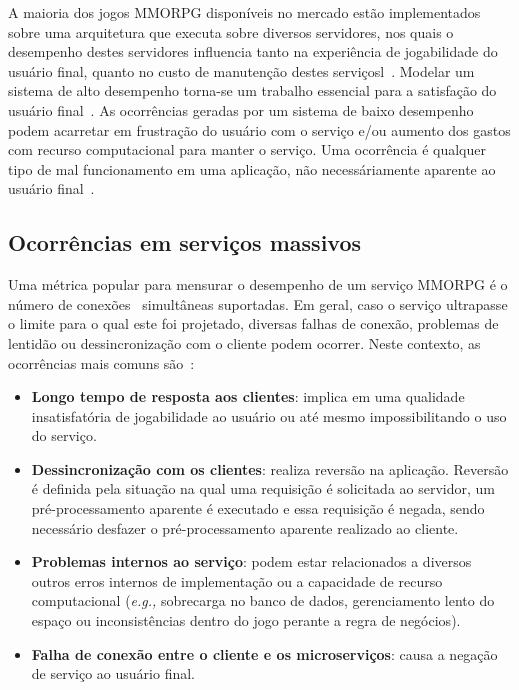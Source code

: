 A maioria dos jogos \ac{MMORPG} disponíveis no mercado estão implementados sobre uma arquitetura que executa sobre diversos servidores, nos quais o desempenho destes servidores influencia tanto na experiência de jogabilidade do usuário final, quanto no custo de manutenção destes serviçosl~\cite{1417630}.
%
Modelar um sistema de alto desempenho torna-se um trabalho essencial para a satisfação do usuário final~\cite{1417630}.
%
As ocorrências geradas por um sistema de baixo desempenho podem acarretar em frustração do usuário com o serviço e/ou aumento dos gastos com recurso computacional para manter o serviço.
%
Uma ocorrência é qualquer tipo de mal funcionamento em uma aplicação, não necessáriamente aparente ao usuário final~\cite{1417630}.

\subsection{Ocorrências em serviços massivos}
\label{sec:ocorrencias}

Uma métrica popular para mensurar o desempenho de um serviço \ac{MMORPG} é o número de conexões~\cite{1417630} simultâneas suportadas.
%
Em geral, caso o serviço ultrapasse o limite para o qual este foi projetado, diversas falhas de conexão, problemas de lentidão ou dessincronização com o cliente podem ocorrer.
%
Neste contexto, as ocorrências mais comuns são~\cite{1417630}:

\begin{itemize}
  \item \textbf{Longo tempo de resposta aos clientes}: implica em uma qualidade insatisfatória de jogabilidade ao usuário ou até mesmo impossibilitando o uso do serviço.
  \item \textbf{Dessincronização com os clientes}: realiza reversão na aplicação. Reversão é definida pela situação na qual uma requisição é solicitada ao servidor, um pré-processamento aparente é executado e essa requisição é negada, sendo necessário desfazer o pré-processamento aparente realizado ao cliente.
  \item \textbf{Problemas internos ao serviço}:  podem estar relacionados a diversos outros erros internos de implementação ou a capacidade de recurso computacional (\textit{e.g.,} sobrecarga no banco de dados, gerenciamento lento do espaço ou inconsistências dentro do jogo perante a regra de negócios).
  \item \textbf{Falha de conexão entre o cliente e os microserviços}: causa a negação de serviço ao usuário final.
\end{itemize}

